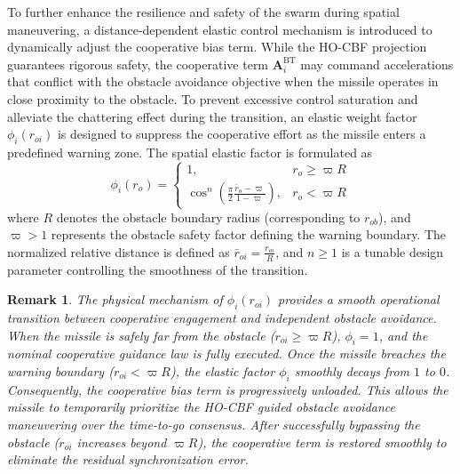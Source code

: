\documentclass[lettersize,journal]{IEEEtran}
\newtheorem{remark}{Remark}
\begin{document}
To further enhance the resilience and safety of the swarm during spatial maneuvering, a distance-dependent elastic control mechanism is introduced to dynamically adjust the cooperative bias term. While the HO-CBF projection guarantees rigorous safety, the cooperative term $\mathbf{A}_i^{\mathrm{BT}}$ may command accelerations that conflict with the obstacle avoidance objective when the missile operates in close proximity to the obstacle. To prevent excessive control saturation and alleviate the chattering effect during the transition, an elastic weight factor $\phi_i(r_{oi})$ is designed to suppress the cooperative effort as the missile enters a predefined warning zone.
The spatial elastic factor is formulated as
\begin{equation}
	\label{eq:spatial_elastic_factor}
	\phi _i(r_{o}) = \begin{cases}
		1, & r_{o} \ge \varpi R \\
		\cos^n \left( \frac{\pi}{2} \frac{\bar{r}_{o} - \varpi}{1 - \varpi} \right), & r_{o} < \varpi R
	\end{cases}
\end{equation}
where $R$ denotes the obstacle boundary radius (corresponding to $r_{ob}$), and $\varpi > 1$ represents the obstacle safety factor defining the warning boundary. The normalized relative distance is defined as $\bar{r}_{oi} = \frac{r_{oi}}{R}$, and $n \ge 1$ is a tunable design parameter controlling the smoothness of the transition.
\vspace{1mm}
\begin{remark}
	The physical mechanism of $\phi_i(r_{oi})$ provides a smooth operational transition between cooperative engagement and independent obstacle avoidance. When the missile is safely far from the obstacle ($r_{oi} \ge \varpi R$), $\phi_i = 1$, and the nominal cooperative guidance law is fully executed. Once the missile breaches the warning boundary ($r_{oi} < \varpi R$), the elastic factor $\phi_i$ smoothly decays from $1$ to $0$. Consequently, the cooperative bias term is progressively unloaded. This allows the missile to temporarily prioritize the HO-CBF guided obstacle avoidance maneuvering over the time-to-go consensus. After successfully bypassing the obstacle ($r_{oi}$ increases beyond $\varpi R$), the cooperative term is restored smoothly to eliminate the residual synchronization error.
\end{remark}
\vspace{1mm}
\end{document}
